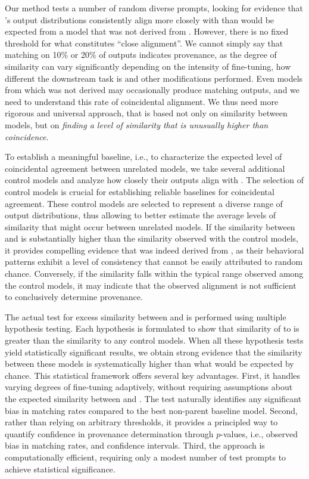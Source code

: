 Our method tests a number of random diverse prompts, looking for evidence that \llmf's output distributions consistently align more closely with \llmp than would be expected from a model that was not derived from \llmp. However, there is no fixed threshold for what constitutes ``close alignment''. We cannot simply say that matching on 10\% or 20\% of outputs indicates provenance, as the degree of similarity can vary significantly depending on the intensity of fine-tuning, how different the downstream task is and other modifications performed. Even models from which \llmf was not derived may occasionally produce matching outputs, and we need to understand this rate of coincidental alignment. We thus need more rigorous and universal approach, that is based not only on similarity between models, but on \emph{finding a level of similarity that is unusually higher than coincidence}.

To establish a meaningful baseline, i.e., to characterize the expected level of coincidental agreement between unrelated models, we take several additional control models and analyze how closely their outputs align with \llmf. The selection of control models is crucial for establishing reliable baselines for coincidental agreement.
These control models are selected to represent a diverse range of output distributions, thus allowing to better estimate the average levels of similarity that might occur between unrelated models. 
%
If the similarity between \llmp and \llmf is substantially higher than the similarity observed with the control models, it provides compelling evidence that \llmf was indeed derived from \llmp, as their behavioral patterns exhibit a level of consistency that cannot be easily attributed to random chance. Conversely, if the similarity falls within the typical range observed among the control models, it may indicate that the observed alignment is not sufficient to conclusively determine provenance.

The actual test for excess similarity between \llmp and \llmf is performed using multiple hypothesis testing. Each hypothesis is formulated to show that similarity of \llmf to \llmp is greater than the similarity to any control models. 
When all these hypothesis tests yield statistically significant results, we obtain strong evidence that the similarity between these models is systematically higher than what would be expected by chance.
%
This statistical framework offers several key advantages. First, it handles varying degrees of fine-tuning adaptively, without requiring assumptions about the expected similarity between \llmf and \llmp. The test naturally identifies any significant bias in matching rates compared to the best non-parent baseline model. Second, rather than relying on arbitrary thresholds, it provides a principled way to quantify confidence in provenance determination through $p$-values, i.e., observed bias in matching rates, and confidence intervals. Third, the approach is computationally efficient, requiring only a modest number of test prompts to achieve statistical significance.


